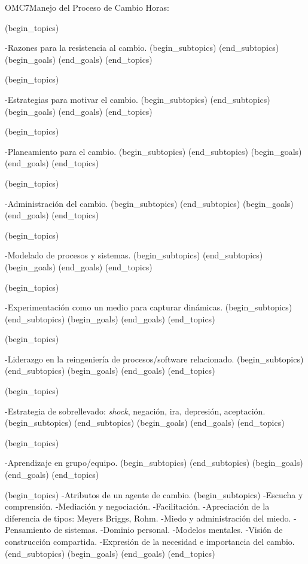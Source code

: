 \begin{BKL2}{OMC7}{Manejo del Proceso de Cambio}
Horas:

 

(begin_topics)

-Razones para la resistencia al cambio.
(begin_subtopics)
(end_subtopics)
(begin_goals)
(end_goals)
(end_topics)

 

(begin_topics)

-Estrategias para motivar el cambio.
(begin_subtopics)
(end_subtopics)
(begin_goals)
(end_goals)
(end_topics)

 

(begin_topics)

-Planeamiento para el cambio.
(begin_subtopics)
(end_subtopics)
(begin_goals)
(end_goals)
(end_topics)

 

(begin_topics)

-Administración del cambio.
(begin_subtopics)
(end_subtopics)
(begin_goals)
(end_goals)
(end_topics)

 

(begin_topics)

-Modelado de procesos y sistemas.
(begin_subtopics)
(end_subtopics)
(begin_goals)
(end_goals)
(end_topics)

 

(begin_topics)

-Experimentación como un medio para capturar dinámicas.
(begin_subtopics)
(end_subtopics)
(begin_goals)
(end_goals)
(end_topics)

 

(begin_topics)

-Liderazgo en la reingeniería de procesos/software relacionado.
(begin_subtopics)
(end_subtopics)
(begin_goals)
(end_goals)
(end_topics)

 

(begin_topics)

-Estrategia de sobrellevado: \textit{shock}, negación, ira, depresión, aceptación.
(begin_subtopics)
(end_subtopics)
(begin_goals)
(end_goals)
(end_topics)

 

(begin_topics)

-Aprendizaje en grupo/equipo.
(begin_subtopics)
(end_subtopics)
(begin_goals)
(end_goals)
(end_topics)


(begin_topics)
-Atributos de un agente de cambio.
(begin_subtopics)
-Escucha y comprensión.
-Mediación y negociación.
-Facilitación.
-Apreciación de la diferencia de tipos: Meyers Briggs, Rohm.
-Miedo y administración del miedo.
-Pensamiento de sistemas.
-Dominio personal.
-Modelos mentales.
-Visión de construcción compartida.
-Expresión de la necesidad e importancia del cambio.
(end_subtopics)
(begin_goals)
(end_goals)
(end_topics)


\end{BKL2}
